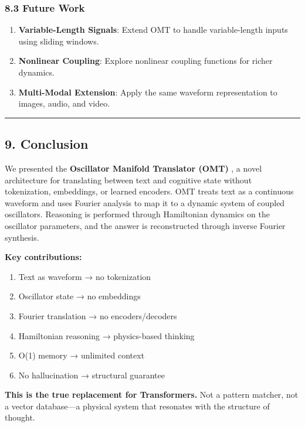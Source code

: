 \documentclass[
  11pt,
  a4paper,
]{article}
\providecommand{\tightlist}{%
  \setlength{\itemsep}{0pt}\setlength{\parskip}{0pt}}
\begin{document}
\subsubsection{8.3 Future Work}\label{future-work}

\begin{enumerate}
\def\labelenumi{\arabic{enumi}.}
\tightlist
\item
  \textbf{Variable-Length Signals}: Extend OMT to handle variable-length
  inputs using sliding windows.
\item
  \textbf{Nonlinear Coupling}: Explore nonlinear coupling functions for
  richer dynamics.
\item
  \textbf{Multi-Modal Extension}: Apply the same waveform representation
  to images, audio, and video.
\end{enumerate}

\begin{center}\rule{0.5\linewidth}{0.5pt}\end{center}

\subsection{9. Conclusion}\label{conclusion}

We presented the \textbf{Oscillator Manifold Translator (OMT)} , a novel
architecture for translating between text and cognitive state without
tokenization, embeddings, or learned encoders. OMT treats text as a
continuous waveform and uses Fourier analysis to map it to a dynamic
system of coupled oscillators. Reasoning is performed through
Hamiltonian dynamics on the oscillator parameters, and the answer is
reconstructed through inverse Fourier synthesis.

\textbf{Key contributions:}

\begin{enumerate}
\def\labelenumi{\arabic{enumi}.}
\tightlist
\item
  Text as waveform → no tokenization
\item
  Oscillator state → no embeddings
\item
  Fourier translation → no encoders/decoders
\item
  Hamiltonian reasoning → physics-based thinking
\item
  O(1) memory → unlimited context
\item
  No hallucination → structural guarantee
\end{enumerate}

\textbf{This is the true replacement for Transformers.} Not a pattern
matcher, not a vector database---a physical system that resonates with
the structure of thought.
\end{document}

